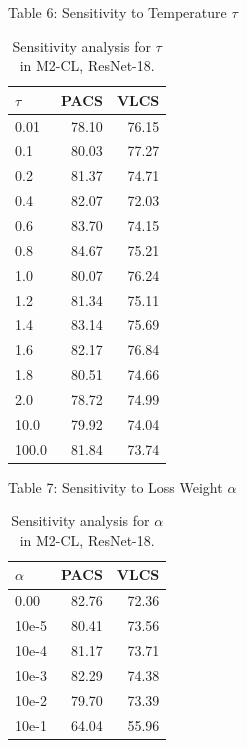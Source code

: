 \documentclass[t, aspectratio=169]{beamer} %
\begin{document}
	\begin{frame}{Table 6: Sensitivity to Temperature $\tau$}
\begin{table}[htbp]
\centering
\caption{Sensitivity analysis for $\tau$ in M2-CL, ResNet-18.}
\scriptsize
\begin{tabular}{lrr}
\toprule
$\tau$ & PACS & VLCS \\
\midrule
0.01 & 78.10 & 76.15 \\
0.1 & 80.03 & 77.27 \\
0.2 & 81.37 & 74.71 \\
0.4 & 82.07 & 72.03 \\
0.6 & 83.70 & 74.15 \\
0.8 & 84.67 & 75.21 \\
1.0 & 80.07 & 76.24 \\
1.2 & 81.34 & 75.11 \\
1.4 & 83.14 & 75.69 \\
1.6 & 82.17 & 76.84 \\
1.8 & 80.51 & 74.66 \\
2.0 & 78.72 & 74.99 \\
10.0 & 79.92 & 74.04 \\
100.0 & 81.84 & 73.74 \\
\bottomrule
\end{tabular}
\end{table}
	\end{frame}

	\begin{frame}{Table 7: Sensitivity to Loss Weight $\alpha$}
\begin{table}[htbp]
\centering
\caption{Sensitivity analysis for $\alpha$ in M2-CL, ResNet-18.}
\scriptsize
\begin{tabular}{lrr}
\toprule
$\alpha$ & PACS & VLCS \\
\midrule
0.00 & 82.76 & 72.36 \\
10e-5 & 80.41 & 73.56 \\
10e-4 & 81.17 & 73.71 \\
10e-3 & 82.29 & 74.38 \\
10e-2 & 79.70 & 73.39 \\
10e-1 & 64.04 & 55.96 \\
\bottomrule
\end{tabular}
\end{table}
	\end{frame}
\end{document}
